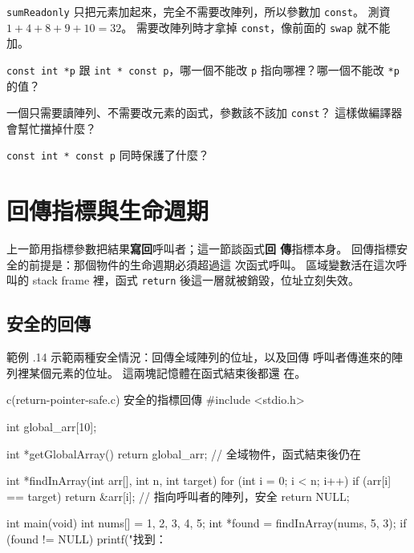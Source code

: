 
\texttt{sumReadonly} 只把元素加起來，完全不需要改陣列，所以參數加
\texttt{const}。 測資 $1+4+8+9+10 = 32$。 需要改陣列時才拿掉
\texttt{const}，像前面的 \texttt{swap} 就不能加。


\begin{drills}[label=drills:ptr-const]
\item \texttt{const int *p} 跟 \texttt{int * const p}，哪一個不能改
\texttt{p} 指向哪裡？哪一個不能改 \texttt{*p} 的值？
\item 一個只需要讀陣列、不需要改元素的函式，參數該不該加
\texttt{const}？ 這樣做編譯器會幫忙擋掉什麼？
\item \texttt{const int * const p} 同時保護了什麼？
\end{drills}

\section{回傳指標與生命週期}
\label{sec:ptr-return-lifetime}

上一節用指標參數把結果\textbf{寫回}呼叫者；這一節談函式\textbf{回
傳}指標本身。 回傳指標安全的前提是：那個物件的生命週期必須超過這
次函式呼叫。 區域變數活在這次呼叫的 stack frame 裡，函式
\texttt{return} 後這一層就被銷毀，位址立刻失效。

\subsection{安全的回傳}

範例 \thechapter.14 示範兩種安全情況：回傳全域陣列的位址，以及回傳
呼叫者傳進來的陣列裡某個元素的位址。 這兩塊記憶體在函式結束後都還
在。

\begin{example}{c}{(return-pointer-safe.c) 安全的指標回傳}
#include <stdio.h>

int global_arr[10];

int *getGlobalArray() {
    return global_arr;     // 全域物件，函式結束後仍在
}

int *findInArray(int arr[], int n, int target) {
    for (int i = 0; i < n; i++) {
        if (arr[i] == target) {
            return &arr[i];  // 指向呼叫者的陣列，安全
        }
    }
    return NULL;
}

int main(void) {
    int nums[] = {1, 2, 3, 4, 5};
    int *found = findInArray(nums, 5, 3);
    if (found != NULL) {
        printf("找到：%
    }
}
\end{example}

